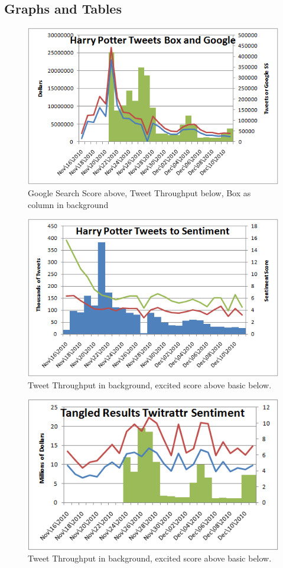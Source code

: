 \documentclass[11pt]{article}
\begin{document}
\subsection{Graphs and Tables}
\begin{figure}[ht!]
\centering
\includegraphics[scale=.55]{img/harrygoog.png} 
\caption{Google Search Score above, Tweet Throughput below, Box as column in background}
\label{fig:harrygoog}
\end{figure}
\begin{figure}[ht!]
\centering
\includegraphics[scale=.55]{img/hptweetsent.png} 
\caption{Tweet Throughput in background, excited score above basic below.}
\label{fig:harrytweetsent}
\end{figure}
\begin{figure}[ht!]
\centering
\includegraphics[scale=.55]{img/twitrattr.png} 
\caption{Tweet Throughput in background, excited score above basic below.}
\label{fig:twitrattr}
\end{figure}
\end{document}

